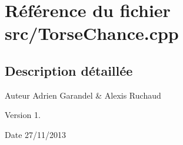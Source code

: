 \section{Référence du fichier src/\-Torse\-Chance.cpp}
\label{_torse_chance_8cpp}


\subsection{Description détaillée}
\begin{DoxyAuthor}{Auteur}
Adrien Garandel \& Alexis Ruchaud 
\end{DoxyAuthor}
\begin{DoxyVersion}{Version}
1. 
\end{DoxyVersion}
\begin{DoxyDate}{Date}
27/11/2013 
\end{DoxyDate}
